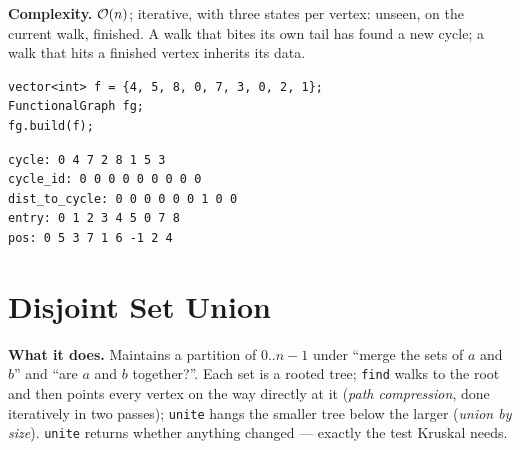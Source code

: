 \textbf{Complexity.} $\mathcal{O}(n)$; iterative, with three states per vertex: unseen, on the current walk, finished. A walk that bites its own tail has found a new cycle; a walk that hits a finished vertex inherits its data.

\begin{diagrambox}
\end{diagrambox}

\begin{lstlisting}[style=snippet]
vector<int> f = {4, 5, 8, 0, 7, 3, 0, 2, 1};
FunctionalGraph fg;
fg.build(f);
\end{lstlisting}
\begin{lstlisting}[style=trace]
cycle: 0 4 7 2 8 1 5 3
cycle_id: 0 0 0 0 0 0 0 0 0
dist_to_cycle: 0 0 0 0 0 0 1 0 0
entry: 0 1 2 3 4 5 0 7 8
pos: 0 5 3 7 1 6 -1 2 4
\end{lstlisting}



\clneed
\section{Disjoint Set Union}
\label{sec:cl-dsu}

\textbf{What it does.} Maintains a partition of $0..n-1$ under ``merge the sets of $a$ and $b$'' and ``are $a$ and $b$ together?''. Each set is a rooted tree; \texttt{find} walks to the root and then points every vertex on the way directly at it (\emph{path compression}, done iteratively in two passes); \texttt{unite} hangs the smaller tree below the larger (\emph{union by size}). \texttt{unite} returns whether anything changed --- exactly the test Kruskal needs.

